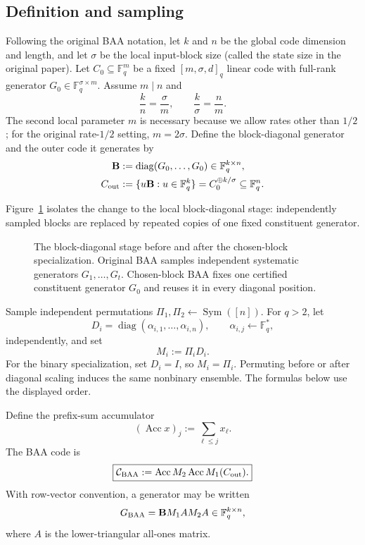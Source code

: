 \documentclass[runningheads,envcountsame,envcountsect]{llncs}
\newcommand{\F}{\mathbb F}
\newcommand{\Acc}{\operatorname{Acc}}
\newcommand{\cC}{\mathcal C}
\begin{document}
\subsection{Definition and sampling}

Following the original BAA notation, let $k$ and $n$ be the global code
dimension and length, and let $\sigma$ be the local input-block size (called the
state size in the original paper).  Let $C_0\subseteq \F_q^m$ be a fixed
$[m,\sigma,d]_q$ linear code with full-rank generator
$G_0\in\F_q^{\sigma\times m}$.  Assume $m\mid n$ and
\[
    \frac{k}{n}=\frac{\sigma}{m},
    \qquad
    \frac{k}{\sigma}=\frac{n}{m}.
\]
The second local parameter $m$ is necessary because we allow rates other than
$1/2$; for the original rate-$1/2$ setting, $m=2\sigma$.  Define the
block-diagonal generator and the outer code it generates by
\[
\begin{aligned}
    \mathbf B&:=\operatorname{diag}(G_0,\ldots,G_0)
      \in\F_q^{k\times n},\\
    C_{\rm out}&:=\{u\mathbf B:u\in\F_q^k\}
      =C_0^{\oplus k/\sigma}\subseteq\F_q^n.
\end{aligned}
\]

Figure~\ref{fig:block-stage-comparison} isolates the change to the local
block-diagonal stage: independently sampled blocks are replaced by repeated
copies of one fixed constituent generator.

\begin{figure}[t]
    \centering
    \resizebox{\linewidth}{!}{}
    \caption{The block-diagonal stage before and after the chosen-block
    specialization.  Original BAA samples independent systematic generators
    $G_1,\ldots,G_t$.  Chosen-block BAA fixes one certified constituent
    generator $G_0$ and reuses it in every diagonal position.}
    \label{fig:block-stage-comparison}
\end{figure}

Sample independent permutations $\Pi_1,\Pi_2\gets\operatorname{Sym}([n])$.
For $q>2$, let
\[
    D_i=\operatorname{diag}(\alpha_{i,1},\ldots,\alpha_{i,n}),
    \qquad
    \alpha_{i,j}\gets\F_q^\ast,
\]
independently, and set
\[
    M_i := \Pi_i D_i .
\]
For the binary specialization, set $D_i=I$, so $M_i=\Pi_i$.  Permuting before
or after diagonal scaling induces the same nonbinary ensemble.  The formulas
below use the displayed order.

Define the prefix-sum accumulator
\[
    (\Acc x)_j := \sum_{\ell\le j}x_\ell .
\]
The BAA code is
\[
    \boxed{
    \cC_{\rm BAA}
      :=
    \Acc M_2 \Acc M_1(C_{\rm out}).
    }
\]
With row-vector convention, a generator may be written
\[
    G_{\rm BAA}=\mathbf B M_1A M_2A
      \in\F_q^{k\times n},
\]
where $A$ is the lower-triangular all-ones matrix.
\end{document}
